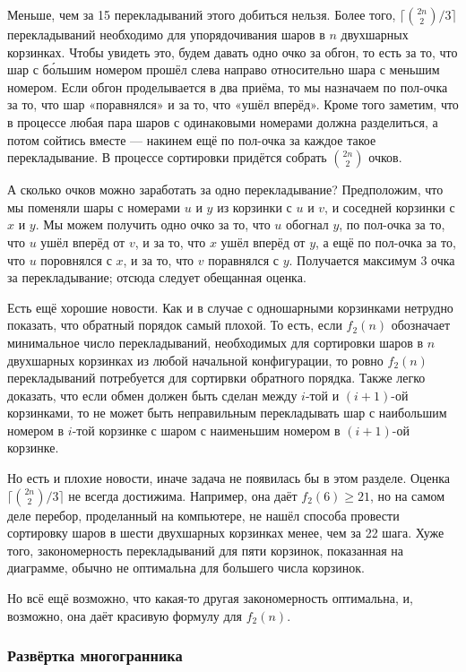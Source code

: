Меньше, чем за 15 перекладываний этого добиться нельзя.
Более того, $\lceil\binom{2n}{2}/3\rceil$ перекладываний необходимо для упорядочивания шаров в $n$ двухшарных корзинках.
Чтобы увидеть это, будем давать одно очко за обгон, то есть за то, что шар с б\'{о}льшим номером прошёл слева направо относительно шара с меньшим номером.
Если обгон проделывается в два приёма, то мы назначаем по пол-очка за то, что шар «поравнялся» и за то, что «ушёл вперёд».
Кроме того заметим, что в процессе любая пара шаров с одинаковыми номерами должна разделиться, а потом сойтись вместе --- накинем ещё по пол-очка за каждое такое перекладывание. 
В процессе сортировки придётся собрать $\binom{2n}2$ очков.

А сколько очков можно заработать за одно перекладывание?
Предположим, что мы поменяли шары с номерами $u$ и $y$ из корзинки с $u$ и $v$, и соседней корзинки с $x$ и $y$.
Мы можем получить одно очко за то, что $u$ обогнал $y$,
по пол-очка за то, что $u$ ушёл вперёд от $v$,
и за то, что $x$ ушёл вперёд от $y$,
а ещё по пол-очка за то, что $u$ поровнялся с $x$, 
и за то, что $v$ поравнялся с $y$.
Получается максимум 3 очка за перекладывание;
отсюда следует обещанная оценка.


Есть ещё хорошие новости.
Как и в случае с одношарными корзинками нетрудно показать, что обратный порядок самый плохой.
То есть, если $f_2(n)$ обозначает минимальное число перекладываний, необходимых для сортировки шаров в $n$ двухшарных корзинках из любой начальной конфигурации, то ровно $f_2(n)$ перекладываний потребуется для сортирвки обратного порядка.
Также легко доказать, что если обмен должен быть сделан между $i$-той и $(i+1)$-ой корзинками, то не может быть неправильным перекладывать шар с наибольшим номером в $i$-той корзинке с шаром с наименьшим номером в $(i+1)$-ой корзинке.

Но есть и плохие новости, иначе задача не появилась бы в этом разделе.
Оценка $\lceil\binom{2n}{2}/3\rceil$ не всегда достижима.
Например, она даёт $f_2(6)\ge 21$, но на самом деле перебор, проделанный на компьютере, не нашёл способа провести сортировку шаров в шести двухшарных корзинках менее, чем за 22 шага.
Хуже того, закономерность перекладываний для пяти корзинок, показанная на диаграмме, обычно не оптимальна для большего числа корзинок.

Но всё ещё возможно, что какая-то другая закономерность оптимальна, и, возможно, она даёт красивую формулу для $f_2(n)$.

\subsubsection*{Развёртка многогранника}

